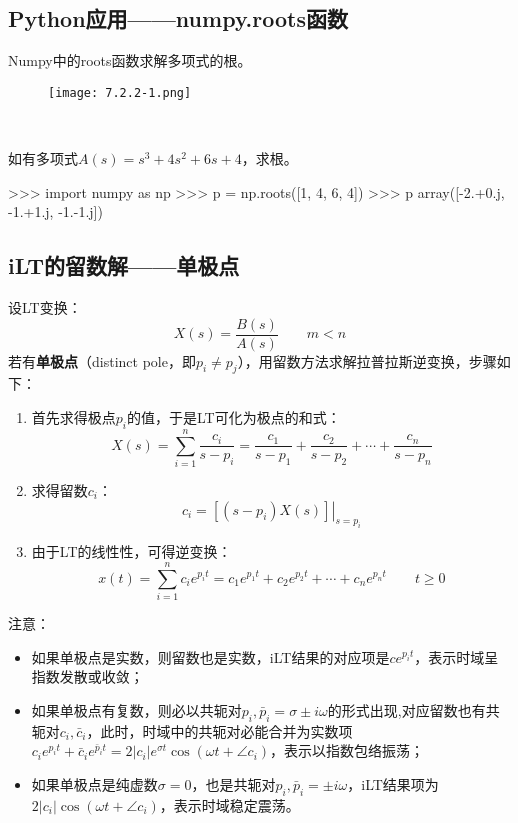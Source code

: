 \subsection{Python应用——numpy.roots函数}

Numpy中的roots函数求解多项式的根。
\begin{figure}[ht]
\centering
\texttt{[image: 7.2.2-1.png]}
\end{figure}

~

\begin{example}
如有多项式$A\left( s \right) =s^3+4s^2+6s+4$，求根。
\end{example}

\begin{python}
>>> import numpy as np
>>> p = np.roots([1, 4, 6, 4])
>>> p
array([-2.+0.j, -1.+1.j, -1.-1.j])
\end{python}

\subsection{iLT的留数解——单极点}

设LT变换：
\[
X\left( s \right) =\frac{B\left( s \right)}{A\left( s \right)} \qquad m<n
\]
若有{\bf 单极点}（distinct pole，即$p_i\ne p_j$），用留数方法求解拉普拉斯逆变换，步骤如下：
\begin{enumerate}
    \item 首先求得极点$p_i$的值，于是LT可化为极点的和式：
    \[
    X\left( s \right) =\sum_{i=1}^n{\frac{c_i}{s-p_i}}=\frac{c_1}{s-p_1}+\frac{c_2}{s-p_2}+\cdots +\frac{c_n}{s-p_n}
    \]
    \item 求得留数$c_i$：
    \[
    c_i=\left. \left[ \left( s-p_i \right) X\left( s \right) \right] \right|_{s=p_i}
    \]
    \item 由于LT的线性性，可得逆变换：
    \[
    x\left( t \right) =\sum_{i=1}^n{c_ie^{p_it}}=c_1e^{p_1t}+c_2e^{p_2t}+\cdots +c_ne^{p_nt} \qquad t\geqslant 0
    \]
\end{enumerate}
注意：
\begin{itemize}
    \item 如果单极点是实数，则留数也是实数，iLT结果的对应项是$ce^{p_it}$，表示时域呈指数发散或收敛；
    \item 如果单极点有复数，则必以共轭对$p_i,\bar{p}_i=\sigma \pm i\omega $的形式出现,对应留数也有共轭对$c_i,\bar{c}_i$，此时，时域中的共轭对必能合并为实数项$c_ie^{p_it}+\bar{c}_ie^{\bar{p}_it}=2\left| c_i \right|e^{\sigma t}\cos \left( \omega t+\angle c_i \right) $，表示以指数包络振荡；
    \item 如果单极点是纯虚数$\sigma =0$，也是共轭对$p_i,\bar{p}_i=\pm i\omega $，iLT结果项为$2\left| c_i \right|\cos \left( \omega t+\angle c_i \right) $，表示时域稳定震荡。
\end{itemize}


